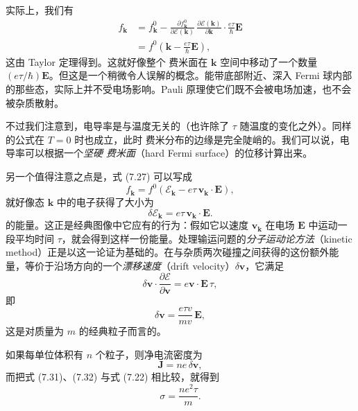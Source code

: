 实际上，我们有
\begin{align*}
f_{\mathbf{k}}&=f_{\mathbf{k}}^{0}-\frac{\partial f_{\mathbf{k}}^{0}}{\partial\mathcal{E}(\mathbf{k})}\,\frac{\partial\mathcal{E}(\mathbf{k})}{\partial\mathbf{k}}\cdot\frac{e\tau}{\hbar}\mathbf{E}\\
&=f^{0}\left(\mathbf{k}-\frac{e\tau}{\hbar}\mathbf{E}\right),\tag{7.27}
\end{align*}
这由 Taylor 定理得到。这就好像整个 费米面在 $\mathbf{k}$ 空间中移动了一个数量 $(e\tau/\hbar)\mathbf{E}$。但这是一个稍微令人误解的概念。能带底部附近、深入 Fermi 球内部的那些态，实际上并不受电场影响。Pauli 原理使它们既不会被电场加速，也不会被杂质散射。

不过我们注意到，电导率是与温度无关的（也许除了 $\tau$ 随温度的变化之外）。同样的公式在 $T=0$ 时也成立，此时 费米分布的边缘是完全陡峭的。我们可以说，电导率可以根据一个\emph{坚硬 费米面}（hard Fermi surface）的位移计算出来。


另一个值得注意之点是，式 (7.27) 可以写成
\begin{equation*}
f_{\mathbf{k}}=f^{0}(\mathcal{E}_{\mathbf{k}}-e\tau\,\mathbf{v}_{\mathbf{k}}\cdot\mathbf{E}),\tag{7.28}
\end{equation*}
就好像态 $\mathbf{k}$ 中的电子获得了大小为
\begin{equation*}
\delta\mathcal{E}_{\mathbf{k}}=e\tau\,\mathbf{v}_{\mathbf{k}}\cdot\mathbf{E}.\tag{7.29}
\end{equation*}
的能量。这正是经典图像中它应有的行为：假如它以速度 $\mathbf{v}_{\mathbf{k}}$ 在电场 $\mathbf{E}$ 中运动一段平均时间 $\tau$，就会得到这样一份能量。处理输运问题的\emph{分子运动论方法}（kinetic method）正是以这一论证为基础的。在与杂质两次碰撞之间获得的这份额外能量，等价于沿场方向的一个\emph{漂移速度}（drift velocity）$\delta\mathbf{v}$，它满足
\begin{equation*}
\delta\mathbf{v}\cdot\frac{\partial\mathcal{E}}{\partial\mathbf{v}}=e\mathbf{v}\cdot\mathbf{E}\,\tau,\tag{7.30}
\end{equation*}
即
\begin{equation*}
\delta\mathbf{v}=\frac{e\tau v}{mv}\,\mathbf{E},\tag{7.31}
\end{equation*}
这是对质量为 $m$ 的经典粒子而言的。

如果每单位体积有 $n$ 个粒子，则净电流密度为
\begin{equation*}
\mathbf{J}=ne\,\delta\mathbf{v},\tag{7.32}
\end{equation*}
而把式 (7.31)、(7.32) 与式 (7.22) 相比较，就得到
\begin{equation*}
\sigma=\frac{ne^{2}\tau}{m}.\tag{7.33}
\end{equation*}

